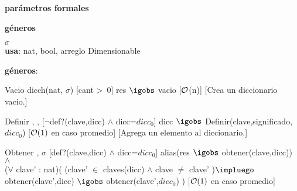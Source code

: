 \begin{Interfaz}

	\textbf{parámetros formales}\parindent\\
	\parbox{1.7cm}{\textbf{géneros}} $\sigma$\\
	
	\textbf{usa}: nat, bool, arreglo Dimensionable
	
	\textbf{géneros}: 
	
	
	\InterfazFuncion
	{Vacio}
	{}
	{dicch(nat, $\sigma$)}
	[cant >\ 0]
	{res $\igobs$ vacio}
	[$\mathcal{O}$(n)]
	[Crea un diccionario vacio.]
	
	\InterfazFuncion
	{Definir}
	{, , }
	{}
	[$\neg$def?(clave,dicc) $\land$ dicc=$dicc_0$]
	{dicc $\igobs$ Definir(clave,significado,$dicc_0$)}
	[$\mathcal{O}(1)$ en caso promedio]
	[Agrega un elemento al diccionario.]	
	
	\InterfazFuncion
	{Obtener}
	{, }
	{$\sigma$}
	[def?(clave,dicc) $\land$ dicc=$dicc_0$]
	{alias(res $\igobs$ obtener(clave,dicc)) 
		$\land$\\ 
		($\forall$ clave' : nat)( (clave' $\in$ claves(dicc) $\land$ clave $\neq$ clave' )$\impluego$ obtener(clave',dicc) $\igobs$ obtener(clave',$dicc_0$) )}
	[$\mathcal{O}(1)$ en caso promedio]
	
\end{Interfaz}

